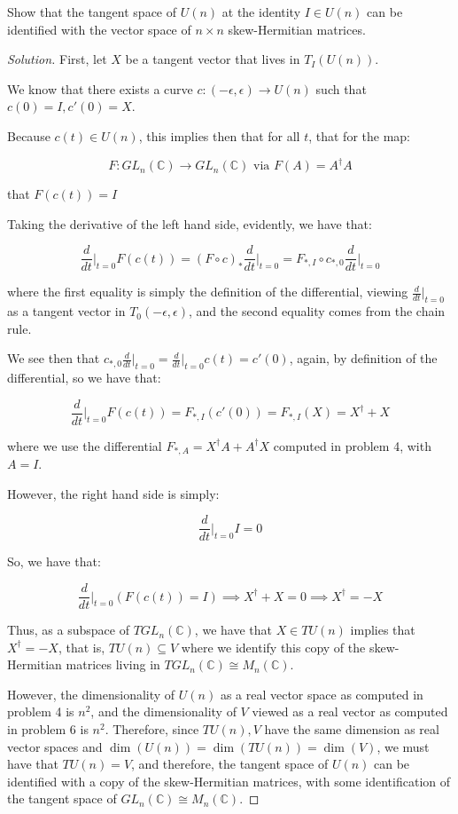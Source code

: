 \documentclass[10pt]{article}
\newenvironment{problem}[2][]{\begin{trivlist}
\item[\hskip \labelsep {\bfseries #1}\hskip \labelsep {\bfseries #2.}]}{\end{trivlist}}
\begin{document}
\begin{problem}{Question 7}

Show that the tangent space of $U(n)$ at the identity $I \in U(n)$ can be identified with the vector space of $n\times n$ skew-Hermitian matrices.

\end{problem}

\begin{proof}[Solution]

First, let $X$ be a tangent vector that lives in $T_I(U(n))$.

We know that there exists a curve $c: (-\epsilon, \epsilon) \to U(n)$ such that $c(0) = I, c'(0) = X$.

Because $c(t) \in U(n)$, this implies then that for all $t$, that for the map:

$$ F: GL_n(\mathbb{C}) \to GL_n(\mathbb{C}) \text{ via } F(A) = A^\dag A $$

that $ F(c(t)) = I$

Taking the derivative of the left hand side, evidently, we have that:

$$ \frac{d}{dt}\bigg|_{t=0} F(c(t)) = (F \circ c)_{*} \frac{d}{dt} \bigg|_{t=0} = F_{*, I} \circ c_{*, 0} \frac{d}{dt}\bigg|_{t=0} $$

where the first equality is simply the definition of the differential, viewing $\frac{d}{dt}\bigg|_{t=0}$ as a tangent vector in $T_0 (-\epsilon, \epsilon)$, and the second equality comes from the chain rule.

We see then that $ c_{*, 0} \frac{d}{dt}\bigg|_{t=0} = \frac{d}{dt} \bigg|_{t=0} c(t) = c'(0)$, again, by definition of the differential, so we have that:

$$  \frac{d}{dt}\bigg|_{t=0} F(c(t))  = F_{*, I} (c'(0)) = F_{*, I}(X) = X^\dag + X$$

where we use the differential $F_{*, A} = X^\dag A + A^\dag X$ computed in problem 4, with $A = I$.

However, the right hand side is simply:

$$\frac{d}{dt}\bigg|_{t=0} I = 0 $$

So, we have that:

$$ \frac{d}{dt}\bigg|_{t=0} \left(  F(c(t)) = I \right) \implies X^\dag + X = 0 \implies X^\dag = -X $$

Thus, as a subspace of $T GL_n(\mathbb{C})$, we have that $X \in TU(n)$ implies that $X^\dag = -X$, that is, $TU(n) \subseteq V$ where we identify this copy of the skew-Hermitian matrices living in $TGL_n(\mathbb{C}) \cong M_n(\mathbb{C})$. 

However, the dimensionality of $U(n)$ as a real vector space as computed in problem 4 is $n^2$, and the dimensionality of $V$ viewed as a real vector as computed in problem 6 is $n^2$. Therefore, since $TU(n), V$ have the same dimension as real vector spaces and $\dim(U(n)) = \dim(TU(n)) = \dim(V)$, we must have that $TU(n) = V$, and therefore, the tangent space of $U(n)$ can be identified with a copy of the skew-Hermitian matrices, with some identification of the tangent space of $GL_n(\mathbb{C}) \cong M_n(\mathbb{C})$.

\end{proof}
\end{document}
